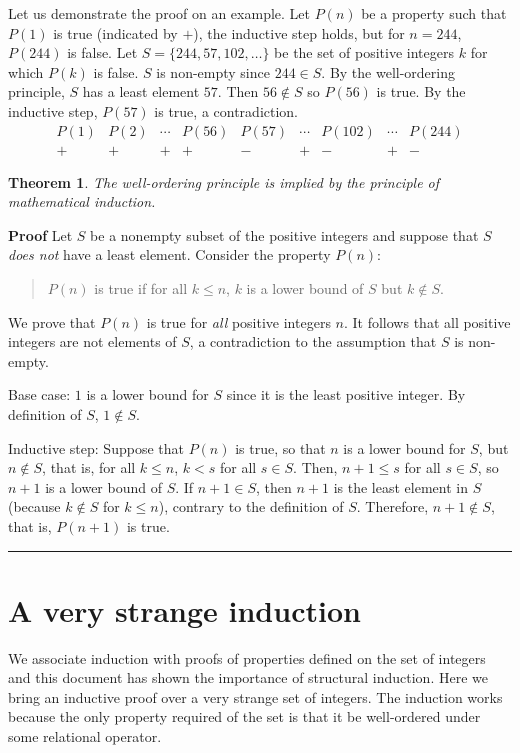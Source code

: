 \documentclass[11pt,a4paper]{report}
\newcommand*{\qed}{\hfill\rule{1ex}{1.5ex}}
\newtheorem{theorem}{Theorem}
\begin{document}
Let us demonstrate the proof on an example. Let $P(n)$ be a property such that $P(1)$ is true (indicated by $+$), the inductive step holds, but for $n=244$, $P(244)$ is false. Let $S=\{244,57,102,\ldots\}$ be the set of positive integers $k$ for which $P(k)$ is false. $S$ is non-empty since $244\in S$. By the well-ordering principle, $S$ has a least element $57$. Then $56\not\in S$ so $P(56)$ is true. By the inductive step, $P(57)$ is true, a contradiction.
\[
\begin{array}{ccccccccc}
P(1) & P(2) & \cdots & P(56) & P(57) & \cdots & P(102) & \cdots & P(244)\\
+ & + & + & + & - & + & -&+&-
\end{array}
\]
\begin{theorem}
The well-ordering principle is implied by the principle of mathematical induction.
\end{theorem}

\textbf{Proof} Let $S$ be a nonempty subset of the positive integers and suppose that $S$ \emph{does not} have a least element. Consider the property $P(n)$:
\begin{quote}
$P(n)$ is true if for all $k\leq n$, $k$ is a lower bound of $S$ but $k\not \in S$.
\end{quote}
We prove that $P(n)$ is true for \emph{all} positive integers $n$. It follows that all positive integers are not elements of $S$, a contradiction to the assumption that $S$ is non-empty.

Base case: $1$ is a lower bound for $S$ since it is the least positive integer. By definition of $S$, $1\not\in S$.

Inductive step: Suppose that $P(n)$ is true, so that $n$ is a lower bound for $S$, but $n\not\in S$, that is, for all $k\leq n$, $k<s$ for all $s\in S$. Then, $n+1\leq s$ for all $s \in S$, so $n+1$ is a lower bound of $S$. If $n+1\in S$, then $n+1$ is the least element in $S$ (because $k\not\in S$ for $k\leq n$), contrary to the definition of $S$. Therefore, $n+1\not\in S$, that is, $P(n+1)$ is true.\qed


\newpage

\section{A very strange induction}

We associate induction with proofs of properties defined on the set of integers and this document has shown the importance of structural induction. Here we bring an inductive proof over a very strange set of integers. The induction works because the only property required of the set is that it be well-ordered under some relational operator.
\end{document}
